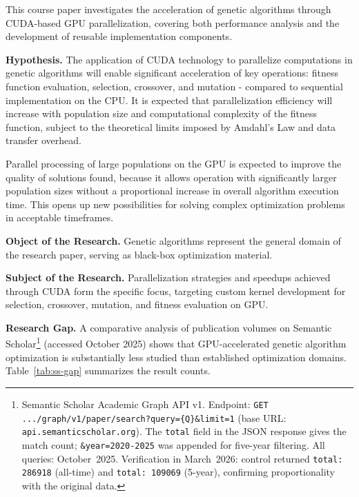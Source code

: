 \documentclass[14pt,a4paper]{extarticle}
\begin{document}
    This course paper investigates the acceleration of genetic algorithms through CUDA-based GPU parallelization, covering both performance analysis and the development of reusable implementation components.

    \bigskip\textbf{Hypothesis.} The application of CUDA technology to parallelize computations in genetic algorithms 
    will enable significant acceleration of key operations: fitness function evaluation, 
    selection, crossover, and mutation - compared to sequential implementation on the CPU. 
    It is expected that parallelization efficiency will increase with population
    size and computational complexity of the fitness function, subject to the theoretical limits imposed by Amdahl's Law and data transfer overhead.

    \bigskip Parallel processing of large populations on the GPU is expected to improve the quality of
    solutions found, because it allows operation with significantly larger population sizes without
    a proportional increase in overall algorithm execution time. This opens up new
    possibilities for solving complex optimization problems in acceptable timeframes.

    \bigskip\textbf{Object of the Research.} Genetic algorithms represent the general domain of the research paper, serving as black-box optimization material.

    \bigskip\textbf{Subject of the Research.} Parallelization strategies and speedups achieved through CUDA form the specific focus, targeting custom kernel development for selection, crossover, mutation, and fitness evaluation on GPU.
    ​

    \bigskip\textbf{Research Gap.} A comparative analysis of publication volumes on Semantic Scholar\footnote{Semantic Scholar Academic Graph API v1. Endpoint: \texttt{GET .../graph/v1/paper/\allowbreak search?\allowbreak query=\{Q\}\&limit=1} (base URL: \texttt{api.semanticscholar.org}). The \texttt{total} field in the JSON response gives the match count; \texttt{\&year=2020-2025} was appended for five-year filtering. All queries: October~2025. Verification in March~2026: control returned \texttt{total:\,286918} (all-time) and \texttt{total:\,109069} (5-year), confirming proportionality with the original data.} (accessed October 2025) shows that GPU-accelerated genetic algorithm optimization is substantially less studied than established optimization domains. Table~\ref{tab:ss-gap} summarizes the result counts.
\end{document}
